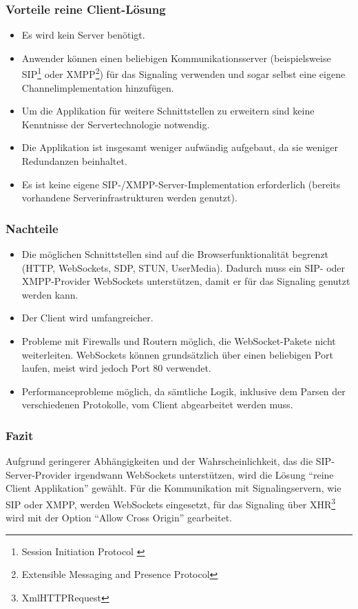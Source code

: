 		\subsubsection{Vorteile reine Client-Lösung}
		\begin{itemize}
			\item Es wird kein Server benötigt.
			\item Anwender können einen beliebigen Kommunikationsserver
			(beispielsweise SIP\footnote{Session Initiation Protocol \cite{IETF-SDP-RFC}} oder
			XMPP\footnote{Extensible Messaging and Presence Protocol}) für das
			Signaling verwenden und sogar selbst eine eigene Channelimplementation
			hinzufügen.
			\item Um die Applikation für weitere Schnittstellen zu erweitern sind keine
			Kenntnisse der Servertechnologie notwendig.
			\item Die Applikation ist insgesamt weniger aufwändig aufgebaut, da sie
			weniger Redundanzen beinhaltet.
			\item Es ist keine eigene SIP-/XMPP-Server-Implementation erforderlich
			(bereits vorhandene Serverinfrastrukturen werden genutzt).
		\end{itemize}
		\subsubsection{Nachteile}
		\begin{itemize}
			\item Die möglichen Schnittstellen sind auf die Browserfunktionalität
			begrenzt (HTTP, WebSockets, SDP, STUN, UserMedia). Dadurch
			muss ein SIP- oder XMPP-Provider WebSockets unterstützen, damit er für das
			Signaling genutzt werden kann.
			\item Der Client wird umfangreicher.
			\item Probleme mit Firewalls und Routern möglich, die WebSocket-Pakete nicht
			weiterleiten. WebSockets können grundsätzlich über einen beliebigen Port laufen, meist wird jedoch Port 80 verwendet.
			\item Performanceprobleme möglich, da sämtliche Logik, inklusive dem Parsen
			der verschiedenen Protokolle, vom Client abgearbeitet werden muss.
		\end{itemize}

		\subsubsection{Fazit}
			Aufgrund geringerer Abhängigkeiten und der Wahrscheinlichkeit, das die
			SIP-Server-Provider irgendwann WebSockets unterstützen, wird die Lösung
			"`reine Client Applikation"' gewählt.
			Für die Kommunikation mit Signalingservern, wie SIP oder XMPP, werden
			WebSockets eingesetzt, für das Signaling über XHR\footnote{XmlHTTPRequest}
			wird mit der Option "`Allow Cross Origin"' gearbeitet.

